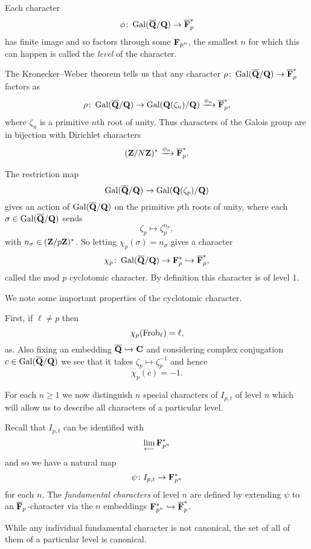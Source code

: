 \documentclass[a4paper,12pt]{article}
\begin{document}
\begin{defn}
Each character
\[
\phi \colon \operatorname{Gal}(\overline{\mathbf{Q}}/\mathbf{Q}) \to \overline{\mathbf{F}}_p^*
\]
has finite image and so factors through some $\mathbf{F}_{p^n}$, the smallest $n$ for which this can happen is called the \emph{level} of the character.
\end{defn}


The Kronecker--Weber theorem tells us that any character $\rho\colon\operatorname{Gal}(\overline{\mathbf{Q}}/\mathbf{Q}) \to \overline{\mathbf{F}}_p^*$ factors as
\[
\rho\colon\operatorname{Gal}(\overline{\mathbf{Q}}/\mathbf{Q}) \to \operatorname{Gal}(\mathbf{Q}(\zeta_n)/\mathbf{Q})\xrightarrow{\phi_n}\overline{\mathbf{F}}_p^*,
\]
where $\zeta_n$ is a primitive $n$th root of unity.
Thus characters of the Galois group are in bijection with Dirichlet characters
\[
(\mathbf{Z}/N\mathbf{Z})^* \xrightarrow{\phi_n}\overline{\mathbf{F}}_p^*.
\]



\begin{defn}
The restriction map
\[
\operatorname{Gal}(\overline{\mathbf{Q}}/\mathbf{Q}) \to \operatorname{Gal}(\mathbf{Q}(\zeta_p)/\mathbf{Q})
\]
gives an action of $\operatorname{Gal}(\overline{\mathbf{Q}}/\mathbf{Q})$ on the primitive $p$th roots of unity, where each $\sigma\in\operatorname{Gal}(\overline{\mathbf{Q}}/\mathbf{Q})$ sends
\[
\zeta_p\mapsto \zeta_p^{n_\sigma},
\]
with $n_\sigma \in (\mathbf{Z}/p\mathbf{Z})^*$.
So letting $\chi_p(\sigma) = n_\sigma$ gives a character
\[
\chi_p\colon\operatorname{Gal}(\overline{\mathbf{Q}}/\mathbf{Q}) \to\mathbf{F}_p^*\hookrightarrow\overline{\mathbf{F}}_p^*,
\]
called the mod $p$ cyclotomic character.
By definition this character is of level 1.
\end{defn}

\begin{rmk}
We note some important properties of the cyclotomic character.

First, if $\ell \ne p$ then
\[
\chi_p(\operatorname{Frob}_\ell) = \ell,
\]
as.
Also fixing an embedding $\overline{\mathbf{Q}}\hookrightarrow\mathbf{C}$ and considering complex conjugation $c\in\operatorname{Gal}(\overline{\mathbf{Q}}/\mathbf{Q})$ we see that it takes $\zeta_p \mapsto\zeta_p^{-1}$ and hence
\[
\chi_p(c) = -1.
\]
\end{rmk}

For each $n \ge 1$ we now distinguish $n$ special characters of $I_{p,t}$ of level $n$ which will allow us to describe all characters of a particular level.

\begin{defn}\label{def:fund}
Recall that $I_{p,t}$ can be identified with
\[
\lim_{\longleftarrow} \mathbf{F}_{p^n}^*
\]
and so we have a natural map
\[
\psi\colon I_{p,t} \to \mathbf{F}_{p^n}^*
\]
for each $n$.
The \emph{fundamental characters} of level $n$ are defined by extending $\psi$ to an $\overline{\mathbf{F}}_p$-character via the $n$ embeddings $\mathbf{F}_{p^n}^* \hookrightarrow \overline{\mathbf{F}}_p^*$. %

While any individual fundamental character is not canonical, the set of all of them of a particular level is canonical. %
\end{defn}
\end{document}
